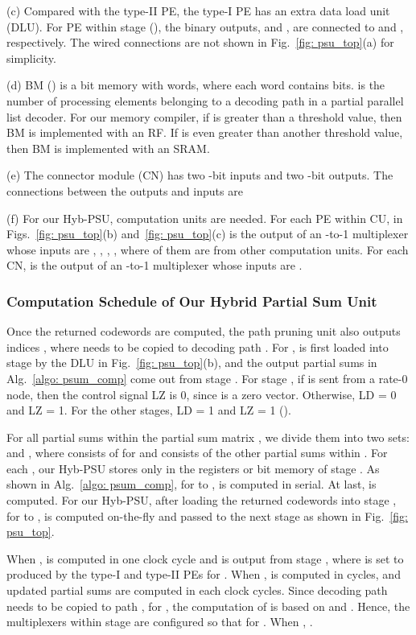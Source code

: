 \documentclass[journal]{IEEEtran}
\begin{document}
(c) Compared with the type-II PE, the type-I PE has an extra data load unit (DLU). For PE within stage  (), the binary outputs,  and , are connected to  and , respectively. The wired connections are not shown in Fig.~\ref{fig: psu_top}(a) for simplicity.

(d) BM () is a bit memory with  words, where each word contains  bits.  is the number of processing elements belonging to a decoding path in a partial parallel list decoder. For our memory compiler, if  is greater than a threshold value, then BM is implemented with an RF. If  is even greater than another threshold value, then BM is implemented with an SRAM.

(e) The connector module (CN) has two -bit inputs and two -bit outputs. The connections between the outputs and inputs are


(f) For our Hyb-PSU,  computation units are needed. For each PE within CU,  in Figs.~\ref{fig: psu_top}(b) and~\ref{fig: psu_top}(c) is the output of an -to-1 multiplexer whose inputs are , , , , where  of them are from other computation units. For each CN,  is the output of an -to-1 multiplexer whose inputs are . 
\subsubsection{Computation Schedule of Our Hybrid Partial Sum Unit}
Once the returned  codewords  are computed, the path pruning unit also outputs  indices , where  needs to be copied to decoding path . For ,  is first loaded into stage  by the DLU in Fig.~\ref{fig: psu_top}(b), and the output partial sums in Alg.~\ref{algo: psum_comp} come out from stage . For stage , if  is sent from a rate-0 node, then the control signal LZ is 0, since  is a zero vector.  Otherwise, LD = 0 and LZ = 1. For the other stages, LD = 1 and LZ = 1 ().

For all partial sums within the partial sum matrix , we divide them into two sets:  and , where  consists of  for  and  consists of the other partial sums within . For each , our Hyb-PSU stores only  in the registers or bit memory of stage .  As shown in Alg.~\ref{algo: psum_comp}, for  to ,  is computed in serial. At last,  is computed. For our Hyb-PSU, after loading the returned  codewords into stage , for  to ,  is computed on-the-fly and passed to the next stage as shown in Fig.~\ref{fig: psu_top}.

When ,  is computed in one clock cycle and is output from stage , where  is set to  produced by the type-I and type-II PEs for . When ,  is computed in  cycles, and  updated partial sums are computed in each clock cycles. Since decoding path  needs to be copied to path , for , the computation of  is based on  and . Hence, the multiplexers within stage  are configured so that  for . When , .
\end{document}

